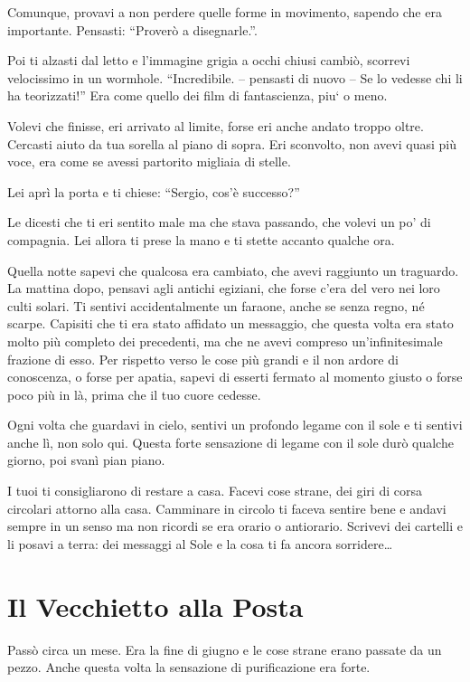 Comunque, provavi a non perdere quelle forme in movimento, sapendo che era importante. Pensasti: ``Proverò a disegnarle.''.

Poi ti alzasti dal letto e l'immagine grigia a occhi chiusi cambiò, scorrevi velocissimo in un wormhole. ``Incredibile. -- pensasti di nuovo -- Se lo vedesse chi li ha teorizzati!'' Era come quello dei film di fantascienza, piu` o meno.

Volevi che finisse, eri arrivato al limite, forse eri anche andato troppo oltre. Cercasti aiuto da tua sorella al piano di sopra. Eri sconvolto, non avevi quasi più voce, era come se avessi partorito migliaia di stelle.

Lei aprì la porta e ti chiese: “Sergio, cos'è successo?”

Le dicesti che ti eri sentito male ma che stava passando, che volevi un po' di compagnia. Lei allora ti prese la mano e ti stette accanto qualche ora.

Quella notte sapevi che qualcosa era cambiato, che avevi raggiunto un traguardo. La mattina dopo, pensavi agli antichi egiziani, che forse c'era del vero nei loro culti solari. Ti sentivi accidentalmente un faraone, anche se senza regno, né scarpe.  Capisiti che ti era stato affidato un messaggio, che questa volta era stato molto più completo dei precedenti, ma che ne avevi compreso un'infinitesimale frazione di esso.  Per rispetto verso le cose più grandi e il non ardore di conoscenza, o forse per apatia, sapevi di esserti fermato al momento giusto o forse poco più in là, prima che il tuo cuore cedesse.

Ogni volta che guardavi in cielo, sentivi un profondo legame con il sole e ti sentivi anche lì, non solo qui.  Questa forte sensazione di legame con il sole durò qualche giorno, poi svanì pian piano.

I tuoi ti consigliarono di restare a casa. Facevi cose strane, dei giri di corsa circolari attorno alla casa. Camminare in circolo ti faceva sentire bene e andavi sempre in un senso ma non ricordi se era orario o antiorario.  Scrivevi dei cartelli e li posavi a terra: dei messaggi al Sole e la cosa ti fa ancora sorridere\ldots

\section{Il Vecchietto alla Posta}
\label{il_vecchietto}

Passò circa un mese. Era la fine di giugno e le cose strane erano passate da un pezzo. Anche questa volta la sensazione di purificazione era forte.

